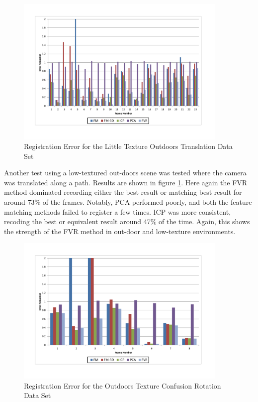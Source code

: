 \begin{figure}[!htb]
\centering
\includegraphics[width=4.0in]{images/results/Outside_No_Texture_Translation}
\caption{Registration Error for the Little Texture Outdoors Translation Data Set}
\label{fig:PET14}
\end{figure}

Another test using a low-textured out-doors scene was tested where the camera was translated along a path. Results are shown in figure \ref{fig:PET14}. Here again the FVR method dominated recording either the best result or matching best result for around 73\% of the frames. Notably, PCA performed poorly, and both the feature-matching methods failed to register a few times. ICP was more consistent, recoding the best or equivalent result around 47\% of the time. Again, this shows the strength of the FVR method in out-door and low-texture environments. 

\begin{figure}[!htb]
\centering
\includegraphics[width=4.0in]{images/results/Outside_TextureConfusion_Rotation}
\caption{Registration Error for the Outdoors Texture Confusion Rotation Data Set}
\label{fig:PET15}
\end{figure}

